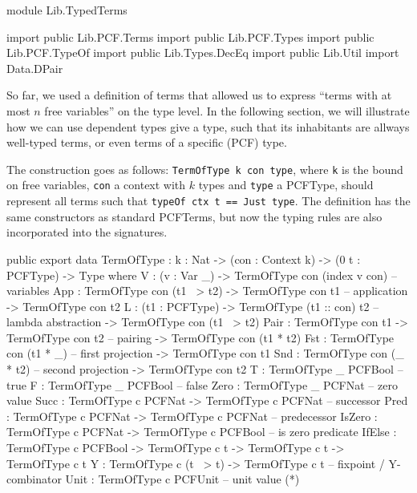 \begin{hidden}
module Lib.TypedTerms

import public Lib.PCF.Terms
import public Lib.PCF.Types
import public Lib.PCF.TypeOf
import public Lib.Types.DecEq
import public Lib.Util
import Data.DPair


\end{hidden}

So far, we used a definition of terms that allowed us to express ``terms with at most $n$ free variables'' on the type level. In the following section, we will illustrate how we can use dependent types give a type, such that its inhabitants are allways well-typed terms, or even terms of a specific (PCF) type.

The construction goes as follows: \texttt{TermOfType k con type}, where \texttt{k} is the bound on free variables, \texttt{con} a context with $k$ types and \texttt{type} a PCFType, should represent all terms  such that \texttt{typeOf ctx t == Just type}.
The definition has the same constructors as standard PCFTerms, but now the typing rules are also incorporated into the
signatures.

\begin{code}
public export
data TermOfType : {k : Nat} -> (con : Context k) -> (0 t : PCFType) -> Type where
    V    : (v : Var _)  -> TermOfType con (index v con)            -- variables
    App  : TermOfType con (t1 ~> t2)  -> TermOfType con t1         -- application
            -> TermOfType con t2  
    L    : (t1 : PCFType)         -> TermOfType (t1 :: con) t2     -- lambda abstraction
            -> TermOfType con (t1 ~> t2)   
    Pair : TermOfType con t1 -> TermOfType con t2                  -- pairing
            -> TermOfType con (t1 * t2)
    Fst   : TermOfType con (t1 * _)                                -- first projection
            -> TermOfType con t1
    Snd   : TermOfType con (_ * t2)                                -- second projection
            -> TermOfType con t2
    T    : TermOfType _ PCFBool                                    -- true
    F    : TermOfType _ PCFBool                                    -- false
    Zero : TermOfType _ PCFNat                                     -- zero value
    Succ : TermOfType c PCFNat -> TermOfType c PCFNat              -- successor
    Pred : TermOfType c PCFNat -> TermOfType c PCFNat              -- predecessor
    IsZero : TermOfType c PCFNat -> TermOfType c PCFBool           -- is zero predicate
    IfElse : TermOfType c PCFBool -> TermOfType c t -> TermOfType c t
                  -> TermOfType c t
    Y     : TermOfType c (t ~> t) -> TermOfType c t                -- fixpoint / Y-combinator
    Unit  : TermOfType c PCFUnit                                   -- unit value (*)
\end{code}

